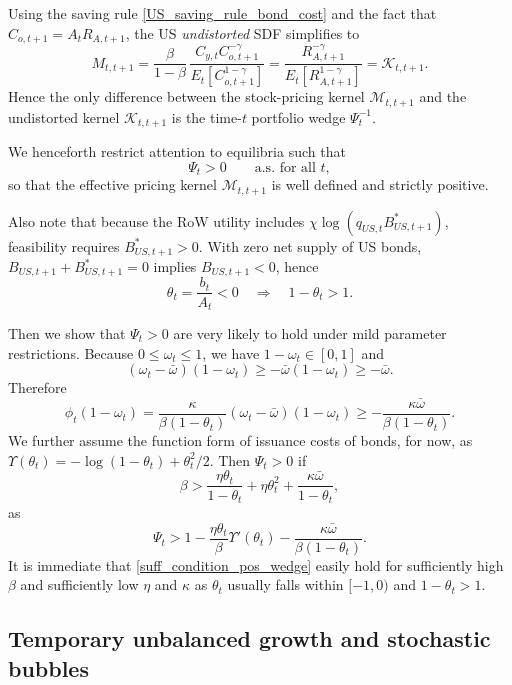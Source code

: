 \documentclass[12pt]{article}
\theoremstyle{plain}
\begin{document}
Using the saving rule \eqref{US_saving_rule_bond_cost} and the fact that $C_{o,t+1}=A_tR_{A,t+1}$,
the US \emph{undistorted} SDF simplifies to
\[
M_{t,t+1}
=
\frac{\beta}{1-\beta}\,
\frac{C_{y,t}C_{o,t+1}^{-\gamma}}{E_t\!\left[C_{o,t+1}^{1-\gamma}\right]}
=
\frac{R_{A,t+1}^{-\gamma}}{E_t\!\left[R_{A,t+1}^{1-\gamma}\right]}
=
\mathcal K_{t,t+1}.
\]
Hence the only difference between the stock-pricing kernel $\mathcal M_{t,t+1}$ and the undistorted kernel
$\mathcal K_{t,t+1}$ is the time-$t$ portfolio wedge $\Psi_t^{-1}$.

We henceforth restrict attention to equilibria such that
\begin{equation}\label{kernel_regular}
\Psi_t>0
\qquad\text{a.s. for all }t,
\end{equation}
so that the effective pricing kernel $\mathcal M_{t,t+1}$ is well defined and strictly positive.

Also note that because the RoW utility includes $\chi\log(q_{US,t}B^*_{US,t+1})$, feasibility requires
$B^*_{US,t+1}>0$. With zero net supply of US bonds,
$B_{US,t+1}+B^*_{US,t+1}=0$ implies $B_{US,t+1}<0$, hence
\begin{equation}\label{theta_nonpos}
\theta_t=\frac{b_t}{A_t}<0
\quad\Rightarrow\quad
1-\theta_t>1.
\end{equation}

Then we show that $\Psi_t>0$ are very likely to hold under mild parameter restrictions.
Because $0\le \omega_t\le 1$, we have $1-\omega_t\in[0,1]$ and
\[
(\omega_t-\bar\omega)(1-\omega_t)
\ge -\bar\omega(1-\omega_t)
\ge -\bar\omega.
\]
Therefore
\[
\phi_t(1-\omega_t)
=
\frac{\kappa}{\beta(1-\theta_t)}(\omega_t-\bar\omega)(1-\omega_t)
\ge
-\frac{\kappa\bar\omega}{\beta(1-\theta_t)}.
\]
We further assume the function form of issuance costs of bonds, for now, as
 $\Upsilon(\theta_t)=-\log(1-\theta_t)+\theta_t^2/2$. Then $\Psi_t >0$ if
\begin{equation} \label{suff_condition_pos_wedge}
	\beta > \frac{\eta \theta_t}{1-\theta_t}+\eta \theta_t^2 +\frac{\kappa\bar\omega}{1-\theta_t},	
\end{equation}
as
\[
\Psi_t > 1-\frac{\eta \theta_t}{\beta} \Upsilon'(\theta_t)-\frac{\kappa\bar\omega}{\beta(1-\theta_t)}.
\]
It is immediate that \eqref{suff_condition_pos_wedge} easily hold for sufficiently high $\beta$ and 
sufficiently low $\eta$ and $\kappa$ as $\theta_t$ usually falls within $[-1,0)$ and $1-\theta_t>1$.

\subsection{Temporary unbalanced growth and stochastic bubbles}
\end{document}
